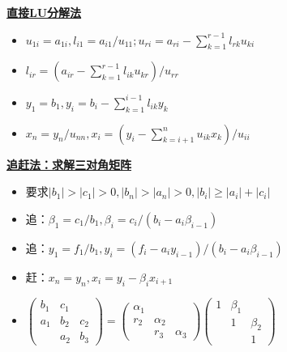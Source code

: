 \documentclass[UTF8,a4paper,landscape,8pt]{paper}
\renewcommand{\subsection}[1]{{\small\textbf{\underline{#1}}}\\ }
\newcommand{\List}[1]{\begin{itemize}[fullwidth,itemindent=0em] #1 \end{itemize}}
\begin{document}
\begin{multicols}{4}
    \subsection{直接LU分解法}
    \List{
        \item {$u_{1i} = a_{1i}, l_{i1} = a_{i1} / u_{11}; u_{ri} = a_{ri} - \sum_{k=1}^{r-1} l_{rk}u_{ki}$}
        \item {$l_{ir} = (a_{ir} - \sum_{k=1}^{r-1} l_{ik}u_{kr})/ u_{rr}$}
        \item {$y_1 = b_1, y_i = b_i - \sum_{k=1}^{i-1} l_{ik}y_k$}
        \item {$x_n = y_n / u_{nn},x_i = (y_i-\sum_{k=i+1}^nu_{ik}x_k) / u_{ii}$}
    }
    \subsection{追赶法：求解三对角矩阵}
    \List{
        \item {要求$|b_1| >|c_1| >0,|b_n| > |a_n| > 0, |b_i| \ge |a_i| + |c_i|$}
        \item {追：$\beta_1 = c_1/b_1, \beta_i = c_i/(b_i-a_i\beta_{i-1})$}
        \item {追：$y_1 = f_1 / b_1, y_i = (f_i - a_iy_{i-1})/(b_i - a_i\beta_{i-1})$}
        \item {赶：$x_n = y_n,x_i = y_i -\beta_ix_{i+1}$}
        \item {$\begin{pmatrix} b_1 & c_1 & \\ a_1 & b_2 & c_2 \\ & a_2 & b_3 \end{pmatrix} = \begin{pmatrix} \alpha_1 & & \\ r_2 & \alpha_2 & \\ & r_3 & \alpha_3 \end{pmatrix} \begin{pmatrix} 1 & \beta_1 & \\ & 1 & \beta_2 \\ & & 1\end{pmatrix}$}
    }

\end{multicols}
\end{document}
